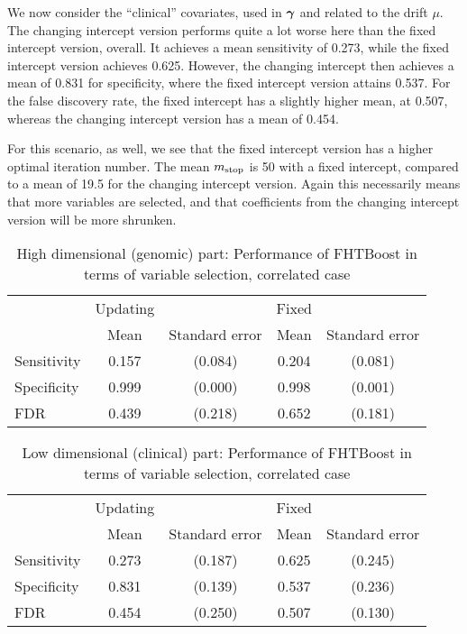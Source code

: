 We now consider the ``clinical'' covariates, used in $\boldsymbol{\gamma}$ and related to the drift $\mu$.
The changing intercept version performs quite a lot worse here than the fixed intercept version, overall.
It achieves a mean sensitivity of 0.273, while the fixed intercept version achieves 0.625.
However, the changing intercept then achieves a mean of 0.831 for specificity, where the fixed intercept version attains 0.537.
For the false discovery rate, the fixed intercept has a slightly higher mean, at 0.507, whereas the changing intercept version has a mean of 0.454.

For this scenario, as well, we see that the fixed intercept version has a higher optimal iteration number.
The mean $m_{\text{stop}}$ is 50 with a fixed intercept, compared to a mean of 19.5 for the changing intercept version.
Again this necessarily means that more variables are selected, and that coefficients from the changing intercept version will be more shrunken.

\begin{table}
\caption{High dimensional (genomic) part: Performance of FHTBoost in terms of variable selection, correlated case}
\label{table:correlated-y0}
\centering
\begin{tabular}{l|cc|cc}
\toprule
& Updating & & Fixed & \\
& Mean & Standard error & Mean & Standard error \\
\hline
Sensitivity & 0.157 & (0.084) & 0.204 & (0.081) \\
Specificity & 0.999 & (0.000) & 0.998 & (0.001) \\
FDR         & 0.439 & (0.218) & 0.652 & (0.181) \\
\bottomrule
\end{tabular}
\end{table}

\begin{table}
\caption{Low dimensional (clinical) part: Performance of FHTBoost in terms of variable selection, correlated case}
\label{table:correlated-mu}
\centering
\begin{tabular}{l|cc|cc}
\toprule
& Updating & & Fixed & \\
& Mean & Standard error & Mean & Standard error \\
\hline
Sensitivity & 0.273 & (0.187) & 0.625 & (0.245) \\
Specificity & 0.831 & (0.139) & 0.537 & (0.236) \\
FDR         & 0.454 & (0.250) & 0.507 & (0.130) \\
\bottomrule
\end{tabular}
\end{table}

